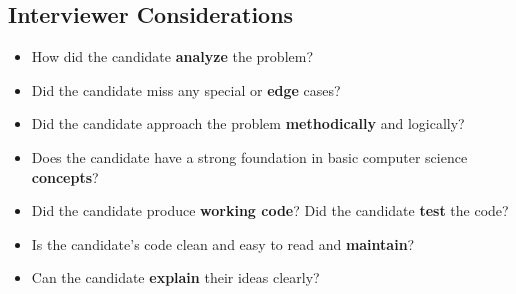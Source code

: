 \subsection{Interviewer Considerations}
\begin{notes}
    \begin{itemize}
        \item How did the candidate \textbf{analyze} the problem?
        \item Did the candidate miss any special or \textbf{edge} cases?
        \item Did the candidate approach the problem \textbf{methodically} and logically?
        \item Does the candidate have a strong foundation in basic computer science \textbf{concepts}?
        \item Did the candidate produce \textbf{working code}? Did the candidate \textbf{test} the code?
        \item Is the candidate's code clean and easy to read and \textbf{maintain}?
        \item Can the candidate \textbf{explain} their ideas clearly?
    \end{itemize}    
\end{notes}

